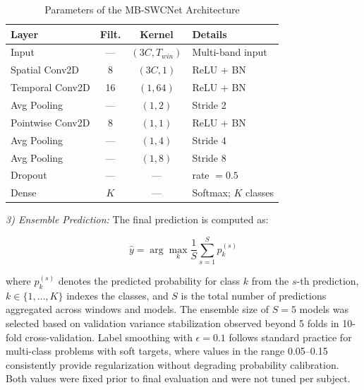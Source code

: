 \documentclass[conference]{IEEEtran}
\begin{document}
\begin{table}[t]
\caption{Parameters of the MB-SWCNet Architecture}
\begin{center}
\setlength{\tabcolsep}{3pt}
\small
\begin{tabular}{|l|c|c|l|}
\hline
\textbf{Layer} & \textbf{Filt.} & \textbf{Kernel} & \textbf{Details} \\
\hline
Input          & ---  & $(3C, T_{win})$ & Multi-band input \\
\hline
Spatial Conv2D & 8    & $(3C, 1)$       & ReLU + BN \\
\hline
Temporal Conv2D& 16   & $(1, 64)$       & ReLU + BN \\
\hline
Avg Pooling    & ---  & $(1, 2)$        & Stride 2 \\
\hline
Pointwise Conv2D& 8   & $(1, 1)$        & ReLU + BN \\
\hline
Avg Pooling    & ---  & $(1, 4)$        & Stride 4 \\
\hline
Avg Pooling    & ---  & $(1, 8)$        & Stride 8 \\
\hline
Dropout        & ---  & ---             & rate $= 0.5$ \\
\hline
Dense          & $K$  & ---             & Softmax; $K$ classes \\
\hline
\end{tabular}
\label{tab:params}
\end{center}
\end{table}

\vspace{1ex}
\noindent \textit{3) Ensemble Prediction:} The final prediction is computed as:

\begin{equation}
\hat{y} = \arg\max_{k} \frac{1}{S} \sum_{s=1}^{S} p_k^{(s)}
\end{equation}

where $p_k^{(s)}$ denotes the predicted probability for class $k$ from the $s$-th prediction, $k \in \{1, \dots, K\}$ indexes the classes, and $S$ is the total number of predictions aggregated across windows and models. The ensemble size of $S = 5$ models was selected based on validation variance stabilization observed beyond 5 folds in 10-fold cross-validation. Label smoothing with $\epsilon = 0.1$ follows standard practice for multi-class problems with soft targets, where values in the range 0.05--0.15 consistently provide regularization without degrading probability calibration. Both values were fixed prior to final evaluation and were not tuned per subject.
\end{document}

